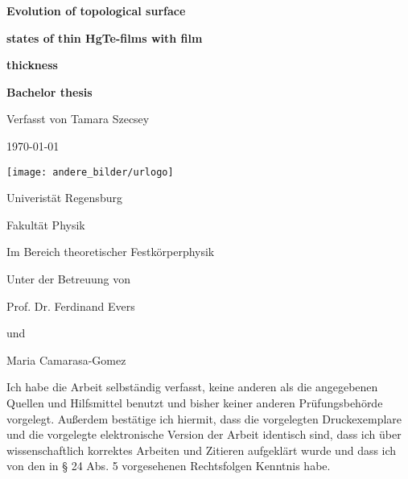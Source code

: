 \documentclass[english, a4, 12pt]{scrartcl}
\begin{document}

	\begin{titlepage}
		\begin{minipage}[c][\textheight][c]{\textwidth}
			\begin{center}
				{ \Huge\textbf{Evolution of topological surface} }
				
				\vspace*{0.3cm}
				{ \Huge \textbf{states of thin HgTe-films with film} }
				
				\vspace*{0.3cm}
				{ \Huge \textbf{thickness} }
				
				\vspace*{1.5cm}
				{\Large \textbf{Bachelor thesis}}
				
				\vspace*{.7cm}
				{\Large Verfasst von Tamara Szecsey}
				
				\vspace*{.5cm}
				{\large \today}
				
				\vspace*{1cm}
				\hspace*{1cm} \texttt{[image: andere\_bilder/urlogo]}
				
				\vspace*{1cm}
				{\large Univeristät Regensburg}
				
				\vspace*{.3cm}
				{\large Fakultät Physik}	
							
				\vspace*{.3cm}
				{\large Im Bereich theoretischer Festkörperphysik}
				
				\vspace*{.7cm}
				{\large Unter der Betreuung von}	
				
				\vspace*{.3cm}
				{\large Prof. Dr. Ferdinand Evers}
				
				\vspace*{.3cm}
				{\large und}	
				
				\vspace*{.3cm}
				{\large Maria Camarasa-Gomez}									
			\end{center}
		\end{minipage}
	\end{titlepage}

\thispagestyle{empty}
Ich habe die Arbeit selbständig verfasst, keine anderen als die angegebenen Quellen und Hilfsmittel benutzt und bisher keiner anderen Prüfungsbehörde vorgelegt. Außerdem bestätige ich hiermit, dass die vorgelegten Druckexemplare und die vorgelegte elektronische Version der Arbeit identisch sind, dass ich über wissenschaftlich korrektes Arbeiten und Zitieren aufgeklärt wurde und dass ich von den in § 24 Abs. 5 vorgesehenen Rechtsfolgen Kenntnis habe. 
\newpage
\thispagestyle{empty}
\tableofcontents	
\clearpage	
\setcounter{page}{1}
\end{document}
